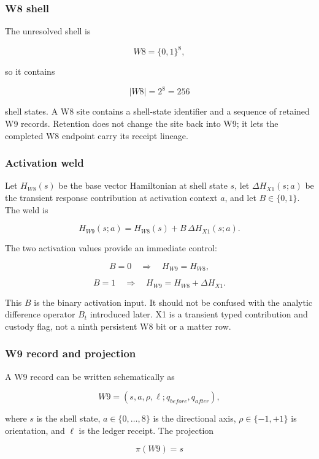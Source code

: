\subsubsection{W8 shell}\label{viii-ch04-w8-shell}

The unresolved shell is

\[
W8=\{0,1\}^8,
\]

so it contains

\[
|W8|=2^8=256
\]

shell states. A W8 site contains a shell-state identifier and a sequence
of retained W9 records. Retention does not change the site back into W9;
it lets the completed W8 endpoint carry its receipt lineage.

\subsubsection{Activation weld}\label{viii-ch04-activation-weld}

Let \(H_{W8}(s)\) be the base vector Hamiltonian at shell state \(s\),
let \(\Delta H_{X1}(s;a)\) be the transient response contribution at
activation context \(a\), and let \(B\in\{0,1\}\). The weld is

\[
H_{W9}(s;a)=H_{W8}(s)+B\,\Delta H_{X1}(s;a).
\]

The two activation values provide an immediate control:

\[
B=0\quad\Longrightarrow\quad H_{W9}=H_{W8},
\]

\[
B=1\quad\Longrightarrow\quad H_{W9}=H_{W8}+\Delta H_{X1}.
\]

This \(B\) is the binary activation input. It should not be confused
with the analytic difference operator \(B_t\) introduced later. X1 is a
transient typed contribution and custody flag, not a ninth persistent W8
bit or a matter row.

\subsubsection{W9 record and projection}\label{viii-ch04-w9-record-and-projection}

A W9 record can be written schematically as

\[
W9=(s,a,\rho,\ell;q_{before},q_{after}),
\]

where \(s\) is the shell state, \(a\in\{0,\ldots,8\}\) is the
directional axis, \(\rho\in\{-1,+1\}\) is orientation, and \(\ell\) is
the ledger receipt. The projection

\[
\pi(W9)=s
\]

